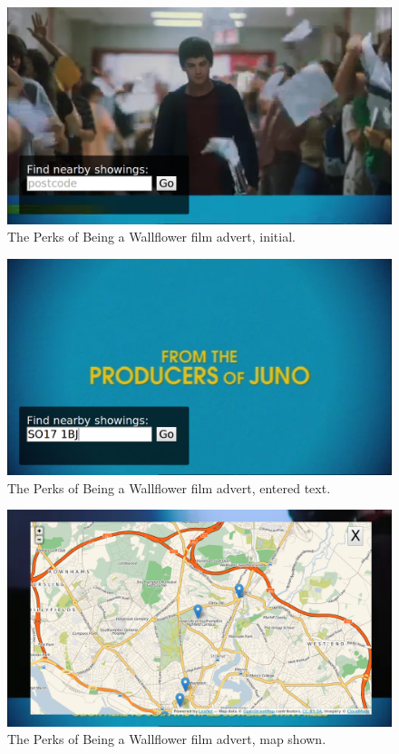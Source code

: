 	\begin{figure}[th]
		\centering
		\includegraphics[width=\textwidth,height=0.5\textheight,keepaspectratio]{images/adverts/wallflower-1.png}
		\caption{The Perks of Being a Wallflower film advert, initial.}
		\label{fig:wallflower1}
	\end{figure}

	\begin{figure}[th]
		\centering
		\includegraphics[width=\textwidth,height=0.5\textheight,keepaspectratio]{images/adverts/wallflower-2.png}
		\caption{The Perks of Being a Wallflower film advert, entered text.}
		\label{fig:wallflower2}
	\end{figure}

	\begin{figure}[th]
		\centering
		\includegraphics[width=\textwidth,height=0.5\textheight,keepaspectratio]{images/adverts/wallflower-3.png}
		\caption{The Perks of Being a Wallflower film advert, map shown.}
		\label{fig:wallflower3}
	\end{figure}


